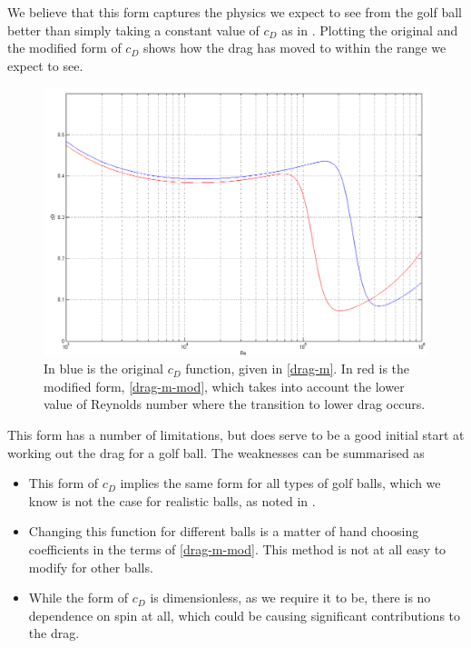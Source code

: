 We believe that this form captures the physics we expect to see from the golf ball better than simply
taking a constant value of $c_D$ as in \citet{Robinson2013}. Plotting the original and the modified
form of $c_D$ shows how the drag has moved to within the range we expect to see.
\begin{figure}
\centering
\includegraphics[scale=0.55]{../images/morrison-modified.png}
\caption[Plotting the original Morrison form against a modified version for golf balls]{In blue is the
original $c_D$ function, given in \eqref{drag-m}. In red is the modified form, \eqref{drag-m-mod}, which
takes into account the lower value of Reynolds number where the transition to lower drag occurs.}
\end{figure}

This form has a number of limitations, but does serve to be a good initial start at working out the 
drag for a golf ball. The weaknesses can be summarised as
\begin{itemize}
\item This form of $c_D$ implies the same form for all types of golf balls, which we know is not the case for
realistic balls, as noted in \citet{Alam2011}.
\item Changing this function for different balls is a matter of hand choosing coefficients in the terms
of \eqref{drag-m-mod}. This method is not at all easy to modify for other balls.
\item While the form of $c_D$ is dimensionless, as we require it to be, there is no dependence on spin
at all, which could be causing significant contributions to the drag.
\end{itemize}

